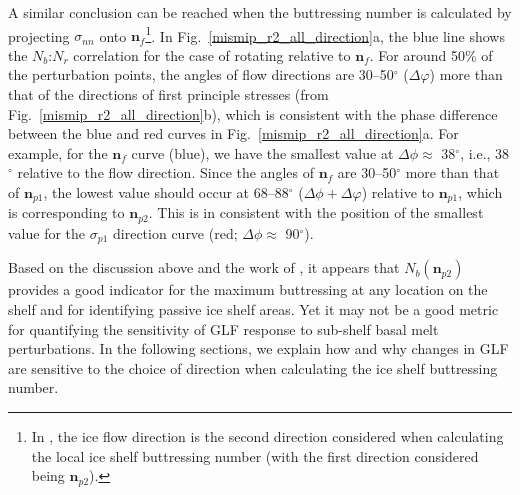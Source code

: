\documentclass[review,oneside]{igs}
\begin{document}

A similar conclusion can be reached when the buttressing number is calculated by projecting $\sigma_{nn}$ onto $\mathbf{n}_{f}$\footnote{In \citet{furst2016}, the ice flow direction is the second direction considered when calculating the local ice shelf buttressing number (with the first direction considered being $\mathbf{n}_{p2}$).}. In Fig.~\ref{mismip_r2_all_direction}a, the blue line shows the $N_b$:$N_r$ correlation for the case of rotating relative to $\mathbf{n}_{f}$. %
For around 50\% of the perturbation points, the angles of flow directions are 30--50$^\circ$ ($\Delta\varphi$) more than that of the directions of first principle stresses (from Fig.~\ref{mismip_r2_all_direction}b), which is consistent with the phase difference between the blue and red curves in Fig.~\ref{mismip_r2_all_direction}a. For example, for the $\mathbf{n}_{f}$ curve (blue), we have the smallest value at $\Delta\phi\approx$ 38$^\circ$, i.e., 38$^\circ$ relative to the flow direction. Since the angles of $\mathbf{n}_{f}$ are 30--50$^\circ$ more than that of $\mathbf{n}_{p1}$, the lowest value should occur at 68--88$^\circ$ ($\Delta\phi+\Delta\varphi$) relative to $\mathbf{n}_{p1}$, which is corresponding to $\mathbf{n}_{p2}$. This is in consistent with the position of the smallest value for the $\sigma_{p1}$ direction curve (red; $\Delta\phi\approx$ 90$^\circ$). %


Based on the discussion above and the work of \citet{furst2016}, it appears that $N_b(\mathbf{n}_{p2})$ provides a good indicator for the maximum buttressing at any location on the shelf and for identifying passive ice shelf areas. Yet it may not be a good metric for quantifying the sensitivity of GLF response to sub-shelf basal melt perturbations. In the following sections, we explain how and why changes in GLF are sensitive to the choice of direction when calculating the ice shelf buttressing number. 
\end{document}
